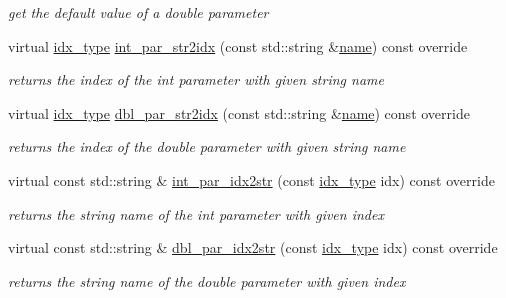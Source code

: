 \begin{Indent}
\begin{DoxyCompactItemize}
\begin{DoxyCompactList}\small\item\em get the default value of a double parameter \end{DoxyCompactList}\item 
virtual \mbox{\hyperlink{class_s_m_spp__di__unipi__it_1_1_thin_compute_interface_aa3d710629ad8c434286726ad810c3b47}{idx\+\_\+type}} \mbox{\hyperlink{class_s_m_spp__di__unipi__it_1_1_solver_ae281b6699b0707a5cdc1e82b76d26c09}{int\+\_\+par\+\_\+str2idx}} (const std\+::string \&\mbox{\hyperlink{class_s_m_spp__di__unipi__it_1_1_solver_a81dba299d9c4ccc6c1e6be0a845142fd}{name}}) const override
\begin{DoxyCompactList}\small\item\em returns the index of the int parameter with given string name \end{DoxyCompactList}\item 
virtual \mbox{\hyperlink{class_s_m_spp__di__unipi__it_1_1_thin_compute_interface_aa3d710629ad8c434286726ad810c3b47}{idx\+\_\+type}} \mbox{\hyperlink{class_s_m_spp__di__unipi__it_1_1_solver_a6d353ac3d1200d9bea89235da61bc4f3}{dbl\+\_\+par\+\_\+str2idx}} (const std\+::string \&\mbox{\hyperlink{class_s_m_spp__di__unipi__it_1_1_solver_a81dba299d9c4ccc6c1e6be0a845142fd}{name}}) const override
\begin{DoxyCompactList}\small\item\em returns the index of the double parameter with given string name \end{DoxyCompactList}\item 
virtual const std\+::string \& \mbox{\hyperlink{class_s_m_spp__di__unipi__it_1_1_solver_a61e973f39747f63b8f56d97cc62e32ce}{int\+\_\+par\+\_\+idx2str}} (const \mbox{\hyperlink{class_s_m_spp__di__unipi__it_1_1_thin_compute_interface_aa3d710629ad8c434286726ad810c3b47}{idx\+\_\+type}} idx) const override
\begin{DoxyCompactList}\small\item\em returns the string name of the int parameter with given index \end{DoxyCompactList}\item 
virtual const std\+::string \& \mbox{\hyperlink{class_s_m_spp__di__unipi__it_1_1_solver_a93f1297e7910e91cc18b303376191026}{dbl\+\_\+par\+\_\+idx2str}} (const \mbox{\hyperlink{class_s_m_spp__di__unipi__it_1_1_thin_compute_interface_aa3d710629ad8c434286726ad810c3b47}{idx\+\_\+type}} idx) const override
\begin{DoxyCompactList}\small\item\em returns the string name of the double parameter with given index \end{DoxyCompactList}\end{DoxyCompactItemize}
\end{Indent}
